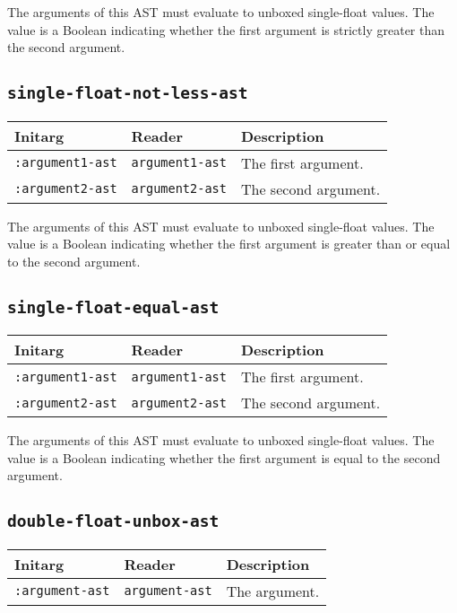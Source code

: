 The arguments of this AST must evaluate to unboxed single-float
values.  The value is a Boolean indicating whether the first argument
is strictly greater than the second argument.

\subsection{\texttt{single-float-not-less-ast}}
\label{sec-ast-single-float-not-less}

\begin{tabular}{|l|l|l|}
\hline
Initarg & Reader & Description\\
\hline\hline
\texttt{:argument1-ast} & \texttt{argument1-ast} & The first argument.\\
\hline
\texttt{:argument2-ast} & \texttt{argument2-ast} & The second argument.\\
\hline
\end{tabular}

The arguments of this AST must evaluate to unboxed single-float
values.  The value is a Boolean indicating whether the first argument
is greater than or equal to the second argument.

\subsection{\texttt{single-float-equal-ast}}
\label{sec-ast-single-float-equal}

\begin{tabular}{|l|l|l|}
\hline
Initarg & Reader & Description\\
\hline\hline
\texttt{:argument1-ast} & \texttt{argument1-ast} & The first argument.\\
\hline
\texttt{:argument2-ast} & \texttt{argument2-ast} & The second argument.\\
\hline
\end{tabular}

The arguments of this AST must evaluate to unboxed single-float
values.  The value is a Boolean indicating whether the first argument
is equal to the second argument.

\subsection{\texttt{double-float-unbox-ast}}
\label{sec-ast-double-float-unbox}

\begin{tabular}{|l|l|l|}
\hline
Initarg & Reader & Description\\
\hline\hline
\texttt{:argument-ast} & \texttt{argument-ast} & The argument.\\
\hline
\end{tabular}

